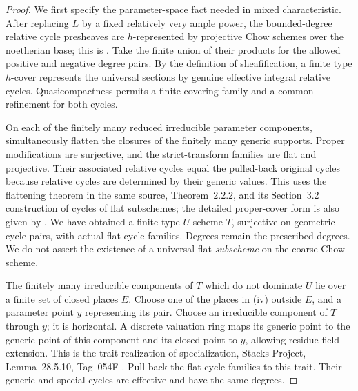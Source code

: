 \begin{proof}
We first specify the parameter-space fact needed in mixed characteristic. After replacing $L$ by a fixed relatively very ample power, the bounded-degree relative cycle presheaves are $h$-represented by projective Chow schemes over the noetherian base; this is \citet[Theorem~4.4.11 and Corollary~4.4.13, manuscript pp.~79--81]{SuslinVoevodsky00}. Take the finite union of their products for the allowed positive and negative degree pairs. By the definition of sheafification, a finite type $h$-cover represents the universal sections by genuine effective integral relative cycles. Quasicompactness permits a finite covering family and a common refinement for both cycles.

On each of the finitely many reduced irreducible parameter components, simultaneously flatten the closures of the finitely many generic supports. Proper modifications are surjective, and the strict-transform families are flat and projective. Their associated relative cycles equal the pulled-back original cycles because relative cycles are determined by their generic values. This uses the flattening theorem in the same source, Theorem~2.2.2, and its Section~3.2 construction of cycles of flat subschemes; the detailed proper-cover form is also given by \citet[Lemmas~6.3.19, 6.3.24 and Theorem~6.3.25, pp.~188--193]{Anderson19}. We have obtained a finite type $U$-scheme $T$, surjective on geometric cycle pairs, with actual flat cycle families. Degrees remain the prescribed degrees. We do not assert the existence of a universal flat \emph{subscheme} on the coarse Chow scheme.

The finitely many irreducible components of $T$ which do not dominate $U$ lie over a finite set of closed places $E$. Choose one of the places in (iv) outside $E$, and a parameter point $y$ representing its pair. Choose an irreducible component of $T$ through $y$; it is horizontal. A discrete valuation ring maps its generic point to the generic point of this component and its closed point to $y$, allowing residue-field extension. This is the trait realization of specialization, Stacks Project, Lemma~28.5.10, Tag~054F \citep{Stacks054F}. Pull back the flat cycle families to this trait. Their generic and special cycles are effective and have the same degrees.


\end{proof}
